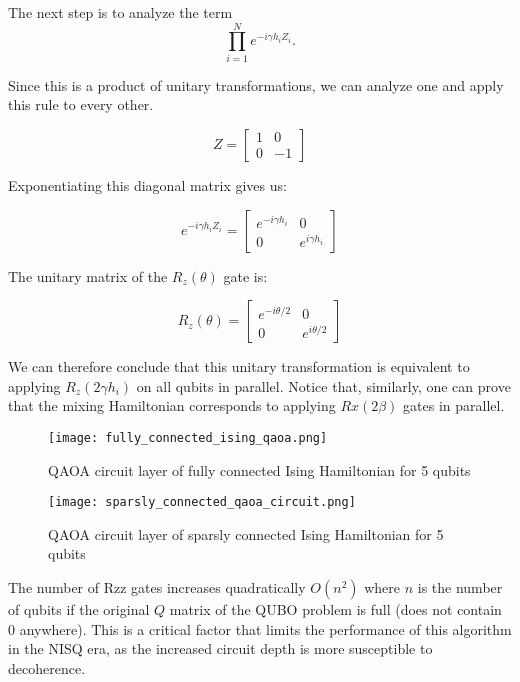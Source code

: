 \documentclass[12pt,a4paper]{report}
\begin{document}
\newpage
\noindent
The next step is to analyze the term 
\[
\prod_{i=1}^{N} e^{-i\gamma h_i Z_i}.
\]

\noindent
Since this is a product of unitary transformations, we can analyze one and apply this rule to every other.

\[
Z = \begin{bmatrix} 1 & 0 \\ 0 & -1 \end{bmatrix}
\]

\noindent
Exponentiating this diagonal matrix gives us:

\[
e^{-i\gamma h_i Z_i} = \begin{bmatrix} e^{-i\gamma h_i} & 0 \\ 0 & e^{i\gamma h_i} \end{bmatrix}
\]

\noindent
The unitary matrix of the \( R_z(\theta) \) gate is:

\[
R_z(\theta) = \begin{bmatrix} e^{-i\theta/2} & 0 \\ 0 & e^{i\theta/2} \end{bmatrix}
\]

\noindent
We can therefore conclude that this unitary transformation is equivalent to applying \( R_z(2\gamma h_i) \) on all qubits in parallel. Notice that, similarly, one can prove that the mixing Hamiltonian corresponds to applying \( Rx(2\beta) \) gates in parallel.

\begin{figure}[h]
    \centering
    \texttt{[image: fully\_connected\_ising\_qaoa.png]}
    \caption{QAOA circuit layer of fully connected Ising Hamiltonian for 5 qubits}
    \label{fig:qaoa_fully_connected}
\end{figure}

\begin{figure}[h]
    \centering
    \texttt{[image: sparsly\_connected\_qaoa\_circuit.png]}
    \caption{QAOA circuit layer of sparsly connected Ising Hamiltonian for 5 qubits}
    \label{fig:qaoa_sparsly_connected}
\end{figure}

\noindent
The number of Rzz gates increases quadratically \(O(n^2)\) where \(n\) is the number of qubits if the original \(Q\) matrix of the QUBO problem is full (does not contain 0 anywhere). This is a critical factor that limits the performance of this algorithm in the NISQ era, as the increased circuit depth is more susceptible to decoherence.
\end{document}
